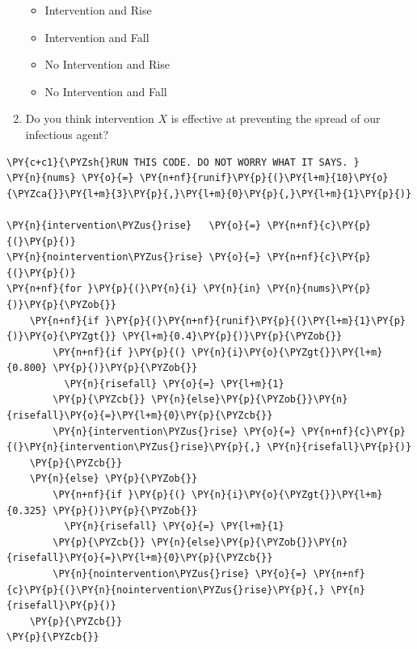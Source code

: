 \begin{enumerate}
  \begin{itemize}
  \tightlist
  \item
    Intervention and Rise
  \item
    Intervention and Fall
  \item
    No Intervention and Rise\\
  \item
    No Intervention and Fall
  \end{itemize}
\item
  Do you think intervention \(X\) is effective at preventing the spread
  of our infectious agent?
\end{enumerate}

    \begin{tcolorbox}[breakable, size=fbox, boxrule=1pt, pad at break*=1mm,colback=cellbackground, colframe=cellborder]
\begin{Verbatim}[commandchars=\\\{\}]
\PY{c+c1}{\PYZsh{}RUN THIS CODE. DO NOT WORRY WHAT IT SAYS. }
\PY{n}{nums} \PY{o}{=} \PY{n+nf}{runif}\PY{p}{(}\PY{l+m}{10}\PY{o}{\PYZca{}}\PY{l+m}{3}\PY{p}{,}\PY{l+m}{0}\PY{p}{,}\PY{l+m}{1}\PY{p}{)}

\PY{n}{intervention\PYZus{}rise}   \PY{o}{=} \PY{n+nf}{c}\PY{p}{(}\PY{p}{)}
\PY{n}{nointervention\PYZus{}rise} \PY{o}{=} \PY{n+nf}{c}\PY{p}{(}\PY{p}{)}
\PY{n+nf}{for }\PY{p}{(}\PY{n}{i} \PY{n}{in} \PY{n}{nums}\PY{p}{)}\PY{p}{\PYZob{}}
    \PY{n+nf}{if }\PY{p}{(}\PY{n+nf}{runif}\PY{p}{(}\PY{l+m}{1}\PY{p}{)}\PY{o}{\PYZgt{}} \PY{l+m}{0.4}\PY{p}{)}\PY{p}{\PYZob{}}
        \PY{n+nf}{if }\PY{p}{(} \PY{n}{i}\PY{o}{\PYZgt{}}\PY{l+m}{0.800} \PY{p}{)}\PY{p}{\PYZob{}}
          \PY{n}{risefall} \PY{o}{=} \PY{l+m}{1}   
        \PY{p}{\PYZcb{}} \PY{n}{else}\PY{p}{\PYZob{}}\PY{n}{risefall}\PY{o}{=}\PY{l+m}{0}\PY{p}{\PYZcb{}}
        \PY{n}{intervention\PYZus{}rise} \PY{o}{=} \PY{n+nf}{c}\PY{p}{(}\PY{n}{intervention\PYZus{}rise}\PY{p}{,} \PY{n}{risefall}\PY{p}{)}
    \PY{p}{\PYZcb{}}
    \PY{n}{else} \PY{p}{\PYZob{}}
        \PY{n+nf}{if }\PY{p}{(} \PY{n}{i}\PY{o}{\PYZgt{}}\PY{l+m}{0.325} \PY{p}{)}\PY{p}{\PYZob{}}
          \PY{n}{risefall} \PY{o}{=} \PY{l+m}{1}   
        \PY{p}{\PYZcb{}} \PY{n}{else}\PY{p}{\PYZob{}}\PY{n}{risefall}\PY{o}{=}\PY{l+m}{0}\PY{p}{\PYZcb{}}
        \PY{n}{nointervention\PYZus{}rise} \PY{o}{=} \PY{n+nf}{c}\PY{p}{(}\PY{n}{nointervention\PYZus{}rise}\PY{p}{,} \PY{n}{risefall}\PY{p}{)}
    \PY{p}{\PYZcb{}}
\PY{p}{\PYZcb{}}
\end{Verbatim}
\end{tcolorbox}
